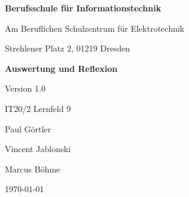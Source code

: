 \documentclass{scrartcl}
\begin{document}
\begin{center}
    \thispagestyle{empty}
    \textbf{Berufsschule für Informationstechnik}

    Am Beruflichen Schulzentrum für Elektrotechnik

    Strehlener Platz 2, 01219 Dresden

    \vfill 
        \LARGE{\textbf{Auswertung und Reflexion}}
        \linebreak
        
        \large{Version 1.0}
        \linebreak
        \linebreak

        \large{IT20/2}
        \linebreak
        \large{Lernfeld 9}
        \linebreak
        \linebreak

        \large{Paul Görtler}
        
        \large{Vincent Jablonski}  

        \large{Marcus Böhme}  
        \linebreak

        \large \today
    \vfill    
\end{center}
\newpage
\setcounter{page}{1}

\tableofcontents
\newpage
\end{document}
